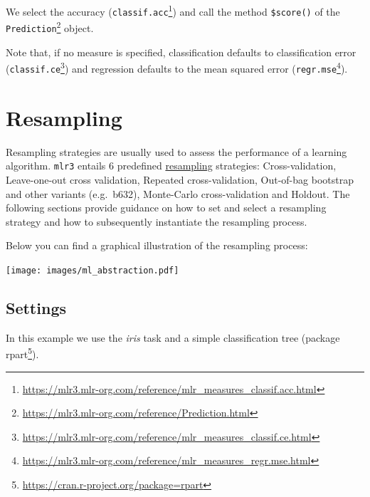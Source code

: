\documentclass[12pt,]{scrbook}
\newenvironment{Shaded}{}{}
\newcommand{\KeywordTok}[1]{\textcolor[rgb]{0.00,0.00,1.00}{#1}}
\newcommand{\NormalTok}[1]{#1}
\newcommand{\OperatorTok}[1]{#1}
\newcommand{\StringTok}[1]{\textcolor[rgb]{0.00,0.50,0.50}{#1}}
\renewcommand{\href}[2]{#2\footnote{\url{#1}}}
\begin{document}
We select the accuracy (\href{https://mlr3.mlr-org.com/reference/mlr_measures_classif.acc.html}{\texttt{classif.acc}}) and call the method \texttt{\$score()} of the \href{https://mlr3.mlr-org.com/reference/Prediction.html}{\texttt{Prediction}} object.

\begin{Shaded}
\end{Shaded}

Note that, if no measure is specified, classification defaults to classification error (\href{https://mlr3.mlr-org.com/reference/mlr_measures_classif.ce.html}{\texttt{classif.ce}}) and regression defaults to the mean squared error (\href{https://mlr3.mlr-org.com/reference/mlr_measures_regr.mse.html}{\texttt{regr.mse}}).

\hypertarget{resampling}{%
\section{Resampling}\label{resampling}}

Resampling strategies are usually used to assess the performance of a learning algorithm.
\texttt{mlr3} entails 6 predefined \protect\hyperlink{resampling}{resampling} strategies:
Cross-validation, Leave-one-out cross validation, Repeated cross-validation, Out-of-bag bootstrap and other variants (e.g.~b632), Monte-Carlo cross-validation and Holdout.
The following sections provide guidance on how to set and select a resampling strategy and how to subsequently instantiate the resampling process.

Below you can find a graphical illustration of the resampling process:

\texttt{[image: images/ml\_abstraction.pdf]}

\hypertarget{resamp-settings}{%
\subsection{Settings}\label{resamp-settings}}

In this example we use the \emph{iris} task and a simple classification tree (package \href{https://cran.r-project.org/package=rpart}{rpart}).
\end{document}
